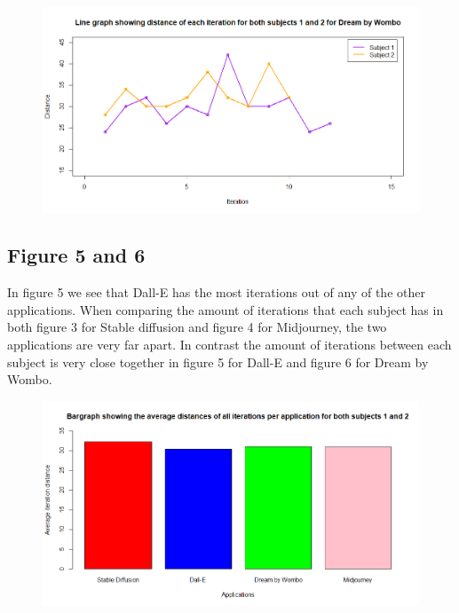 \documentclass[]{report}
\begin{document}
\begin{figure}[!htbp]
	\centering
	\includegraphics[width=1\linewidth]{LineGraphDBW}
	\caption{}
	\label{fig:linegraphdbw}
\end{figure}

\pagebreak
\subsection{Figure 5 and 6}

In figure 5 we see that Dall-E has the most iterations out of any of the other applications. When comparing the amount of iterations that each subject has in both figure 3 for Stable diffusion and figure 4 for Midjourney, the two applications are very far apart. In contrast the amount of iterations between each subject is very close together in figure 5 for Dall-E and figure 6 for Dream by Wombo.



\begin{figure}[!htbp]
	\centering
	\includegraphics[width=1\linewidth]{Bargraph}
	\caption{}
	\label{fig:bargraph}
\end{figure}
\pagebreak
\end{document}
